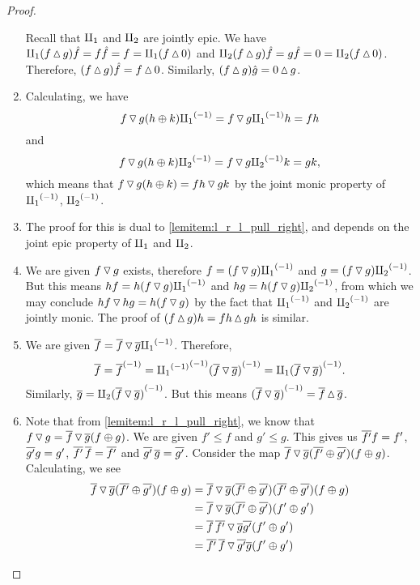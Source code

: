 \begin{proof}
\begin{enumerate}[{(}i{)}]
      Recall that $\amalg_{1}$ and $\amalg_{2}$ are jointly epic. We have
      $\amalg_{1}(f \operatorname{\vartriangle} g)\hat{f} = f\hat{f} = f = \amalg_{1}(f\operatorname{\vartriangle} 0) $ and
      $\amalg_{2}(f \operatorname{\vartriangle} g)\hat{f} = g\hat{f} = 0= \amalg_{2}(f\operatorname{\vartriangle} 0)$.
      Therefore, $(f \operatorname{\vartriangle} g)\hat{f} = f \operatorname{\vartriangle} 0$. Similarly,
      $(f \operatorname{\vartriangle} g) \hat{g} = 0 \operatorname{\vartriangle} g$.
    \item Calculating, we have
      \[
        f \operatorname{\triangledown} g (h \oplus k) {\amalg_{1}}^{(-1)} = f\operatorname{\triangledown} g {\amalg_{1}}^{(-1)} h = f h
      \]
      and
      \[
        f \operatorname{\triangledown} g (h \oplus k) {\amalg_{2}}^{(-1)} = f\operatorname{\triangledown} g {\amalg_{2}}^{(-1)} k = g k,
      \]
      which means that
      $f \operatorname{\triangledown} g (h \oplus k) = f h \operatorname{\triangledown} g k$ by the joint monic property of ${\amalg_{1}}^{(-1)}$, ${\amalg_{2}}^{(-1)}$.
    \item The proof for this is dual to \ref{lemitem:l_r_l_pull_right}, and depends on the joint
      epic property of $\amalg_{1}$ and $\amalg_{2}$.
    \item We are given $f\operatorname{\triangledown} g$ exists, therefore $f = (f\operatorname{\triangledown} g){\amalg_{1}}^{(-1)}$ and
      $g = (f\operatorname{\triangledown} g){\amalg_{2}}^{(-1)}$. But this means $hf = h(f\operatorname{\triangledown} g){\amalg_{1}}^{(-1)}$ and
      $h g = h(f\operatorname{\triangledown} g){\amalg_{2}}^{(-1)}$, from which we may conclude $hf \operatorname{\triangledown} h g = h(f\operatorname{\triangledown} g)$ by
      the fact that ${\amalg_{1}}^{(-1)}$ and ${\amalg_{2}}^{(-1)}$ are jointly monic. The proof of
      $(f\operatorname{\vartriangle} g)h = f h \operatorname{\vartriangle} g h$ is similar.
    \item We are given $\overline{f} = \overline{f}\operatorname{\triangledown}\overline{g} {\amalg_{1}}^{(-1)}$. Therefore,
      \[
        \overline{f} = {\overline{f}}^{(-1)} = {{\amalg_{1}}^{(-1)}}^{(-1)}{(\overline{f}\operatorname{\triangledown}\overline{g})}^{(-1)}
          = \amalg_{1} {(\overline{f}\operatorname{\triangledown}\overline{g})}^{(-1)}.
      \]
      Similarly, $\overline{g} = \amalg_{2} {(\overline{f}\operatorname{\triangledown}\overline{g})}^{(-1)}$. But this means
      ${(\overline{f}\operatorname{\triangledown}\overline{g})}^{(-1)} = \overline{f}\operatorname{\vartriangle}\overline{g}$.
    \item Note that from \ref{lemitem:l_r_l_pull_right}, we know that
      $f \operatorname{\triangledown} g  = \overline{f} \operatorname{\triangledown} \overline{g} (f\oplus g)$. We are given $f' \le f$ and $g' \le g$. This
      gives us $\overline{f'}f =f'$, $\overline{g'}g =g'$, $\overline{f'}\,\overline{f} =\overline{f'}$ and
      $\overline{g'}\,\overline{g} =\overline{g'}$. Consider the map
      $\overline{f} \operatorname{\triangledown} \overline{g} (\overline{f'}\oplus\overline{g'})(f\oplus g)$. Calculating, we see
      \begin{align*}
        \rst{f} \tjdown \rst{g} (\rst{f'}\+\rst{g'})(f\+g)
          &= \rst{f} \tjdown \rst{g} (\rst{f'}\+\rst{g'})(\rst{f'}\+\rst{g'})(f\+g) \\
          & = \rst{f} \tjdown \rst{g} (\rst{f'}\+\rst{g'})(f'\+g') \\
          & = \rst{f}\,\rst{f'} \tjdown \rst{g} \rst{g'} (f'\+g') \\
          & = \rst{f'}\,\rst{f} \tjdown \rst{g'} \rst{g} (f'\+g') \\

\end{align*}
\end{enumerate}
\end{proof}
